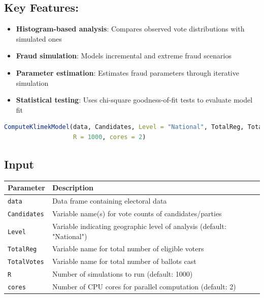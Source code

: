 \documentclass{article}
\begin{document}
\subsection{Key Features:}
\begin{itemize}
    \item \textbf{Histogram-based analysis}: Compares observed vote distributions with simulated ones
    \item \textbf{Fraud simulation}: Models incremental and extreme fraud scenarios
    \item \textbf{Parameter estimation}: Estimates fraud parameters through iterative simulation
    \item \textbf{Statistical testing}: Uses chi-square goodness-of-fit tests to evaluate model fit
\end{itemize}

\begin{lstlisting}[language=R]
ComputeKlimekModel(data, Candidates, Level = "National", TotalReg, TotalVotes, 
                   R = 1000, cores = 2)
\end{lstlisting}

\subsection{Input}
\begin{longtable}{p{4cm}p{10cm}}
\toprule
\textbf{Parameter} & \textbf{Description} \\
\midrule
\texttt{data} & Data frame containing electoral data \\
\texttt{Candidates} & Variable name(s) for vote counts of candidates/parties \\
\texttt{Level} & Variable indicating geographic level of analysis (default: "National") \\
\texttt{TotalReg} & Variable name for total number of eligible voters \\
\texttt{TotalVotes} & Variable name for total number of ballots cast \\
\texttt{R} & Number of simulations to run (default: 1000) \\
\texttt{cores} & Number of CPU cores for parallel computation (default: 2) \\
\bottomrule
\end{longtable}
\end{document}
